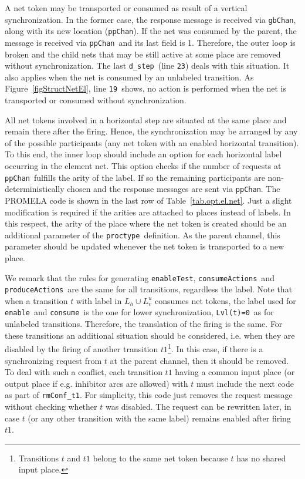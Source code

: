 \documentclass{llncs}
\begin{document}
A net token may be transported or consumed as result of a vertical synchronization. In the former case, the response message is received via \small\verb"gbChan"\nfont, along with its new location (\small\verb"ppChan"\nfont). If the net was consumed by the parent, the message is received via \small\verb"ppChan"\nfont\  and its last field is 1. Therefore, the outer loop is broken and the child nets that may be still active at some place are removed without synchronization. The last \small\verb"d_step"\nfont\ (line \small\verb"23"\nfont) deals with this situation.
It also applies when the net is consumed by an unlabeled transition.  As Figure~\ref{figStructNetEl}, line \small\verb"19"\nfont\ shows, no action is performed when the net is transported or consumed without synchronization.

All net tokens involved in a horizontal step are situated at the same place and remain there after the firing. Hence, the synchronization may be arranged by any of the possible participants (any net token with an enabled horizontal transition). To this end, the inner loop should include an option for each horizontal label occurring in the element net.  This option checks if the number of requests at \small\verb"ppChan"\nfont\  fulfills the arity of the label. If so the remaining participants are non-deterministically chosen and the response messages are sent via \small\verb"ppChan"\nfont. The PROMELA code is shown in the last row of Table~\ref{tab.opt.el.net}. Just a slight modification is required if the arities are attached to places instead of labels. In this respect, the arity of the place where the net token is created should be an additional parameter of the \small\verb"proctype"\nfont\  definition. As the parent channel, this parameter should be updated whenever the net token is transported to a new place.

We  remark that the rules for generating \small\verb"enableTest"\nfont, \small\verb"consumeActions"\nfont\ and \small\verb"produceActions"\nfont\ are the same for all transitions, regardless the label. Note that when a transition $t$ with label in $L_h\cup L_v^u$ consumes net tokens, the label used for \small\verb"enable"\nfont\  and \small\verb"consume"\nfont\ is the one for lower synchronization, \small\verb"Lvl(t)=0"\nfont\ as for unlabeled transitions. Therefore, the translation of the firing is the same. For these transitions an additional situation should be considered, i.e. when they are disabled by the firing of another transition $t1$\footnote{Transitions $t$ and $t1$ belong to the same net token because $t$ has no shared input place.}. In this case, if there is a synchronizing request from $t$ at the parent channel, then it should be removed. To deal with such a conflict, each transition $t1$ having a common input place (or output place if e.g. inhibitor arcs are allowed) with $t$ must include the next code as part of \small\verb"rmConf_t1"\nfont. For simplicity, this code just removes the request message without checking whether $t$ was disabled. The request can be rewritten later, in case $t$ (or any other transition with the same label) remains enabled after firing $t1$.
\end{document}

